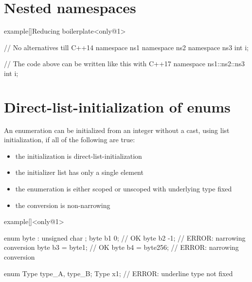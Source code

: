 \section{Nested namespaces}
\begin{frame}[fragile]{\insertsectionhead}
    \vspace{-6mm}
    \begin{varblock}{example}[\textwidth]{Reducing boilerplate}<only@1>
        \begin{Cpp}
            // No alternatives till C++14
            namespace ns1 {
                namespace ns2 {
                    namespace ns3 {
                        int i;
                    }
                }
            }

            // The code above can be written like this with C++17
            namespace ns1::ns2::ns3 {
                int i;
            }
        \end{Cpp}
    \end{varblock}
\end{frame}

\section{Direct-list-initialization of enums}
\begin{frame}[fragile]{\insertsectionhead}
    \vspace{-3mm}
    An enumeration can be initialized from an integer without a cast, using list initialization, if all of the following are true:
    \begin{itemize}
        \small
        \item the initialization is direct-list-initialization
        \item the initializer list has only a single element
        \item the enumeration is either scoped or unscoped with underlying type fixed
        \item the conversion is non-narrowing
    \end{itemize}
    \begin{varblock}{example}[\textwidth]{}<only@1>
        \begin{Cpp}
            enum byte : unsigned char {};
            byte b1 {0};         // OK
            byte b2 {-1};        // ERROR: narrowing conversion
            byte b3 = byte{1};   // OK
            byte b4 = byte{256}; // ERROR: narrowing conversion

            enum Type {type_A, type_B};
            Type x{1};           // ERROR: underline type not fixed
        \end{Cpp}
    \end{varblock}
\end{frame}

